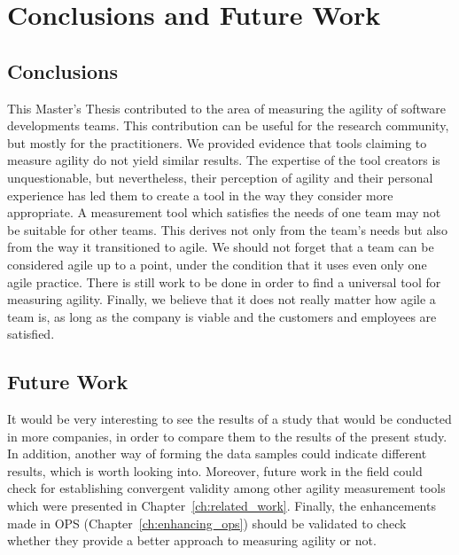 \chapter{Conclusions and Future Work}
\label{ch:conclusions_future_work}

\section{Conclusions}

This Master's Thesis contributed to the area of measuring the agility of software developments teams. This contribution can be useful for the research community, but mostly for the practitioners. We provided evidence that tools claiming to measure agility do not yield similar results. The expertise of the tool creators is unquestionable, but nevertheless, their perception of agility and their personal experience has led them to create a tool in the way they consider more appropriate. A measurement tool which satisfies the needs of one team may not be suitable for other teams. This derives not only from the team's needs but also from the way it transitioned to agile. We should not forget that a team can be considered agile up to a point, under the condition that it uses even only one agile practice. There is still work to be done in order to find a universal tool for measuring agility. Finally, we believe that it does not really matter how agile a team is, as long as the company is viable and the customers and employees are satisfied.

\section{Future Work}

It would be very interesting to see the results of a study that would be conducted in more companies, in order to compare them to the results of the present study. In addition, another way of forming the data samples could indicate different results, which is worth looking into. Moreover, future work in the field could check for establishing convergent validity among other agility measurement tools which were presented in Chapter~\ref{ch:related_work}. Finally, the enhancements made in \ac{OPS} (Chapter~\ref{ch:enhancing_ops}) should be validated to check whether they provide a better approach to measuring agility or not.